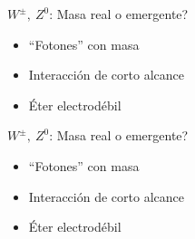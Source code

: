 \documentclass[%
xcolor=pdftex,dvipsnames,table%
]{beamer}
\begin{document}
{
\begin{frame}{$W^\pm,\ Z^0$: Masa \alert{real} o emergente?}
\qquad
\vspace{6cm}
\begin{itemize}
\item ``Fotones'' con masa
\item Interacción de corto alcance
\item Éter electrodébil
\end{itemize}
\end{frame}
}
{
\begin{frame}{$W^\pm,\ Z^0$: Masa real o \alert{emergente}?}
\qquad
\vspace{6cm}
\begin{itemize}
\item ``Fotones'' con masa
\item Interacción de corto alcance
\item Éter electrodébil
\end{itemize}
\end{frame}
}
\end{document}
